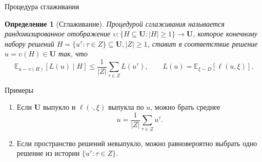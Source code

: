 \documentclass[aspectratio=169]{beamer}
\newtheorem{ru_definition}{Определение}
\begin{document}
\begin{frame}{Процедура сглаживания}
\footnotesize
\begin{ru_definition}[Сглаживание]
Процедурой сглаживания называется рандомизированное отображение $\upsilon:\{H\subseteq \mathbf{U}: |H|\ge 1\}\to \mathbf{U}$,
которое конечному набору решений $ H=\{u^\tau:\tau\in Z\}\subseteq\mathbf{U}, |Z|\ge1$,
ставит в соответствие решение $u=\upsilon(H)\in\mathbf{U}$ так, что
\[
\mathbb{E}_{u\sim\upsilon(H)}[L(u)\mid H]
\le
\frac{1}{|Z|}\sum_{\tau\in Z}L(u^\tau),
\qquad
L(u)=\mathbb{E}_{\xi\sim D}[\ell(u,\xi)].
\]
\end{ru_definition}

\begin{exampleblock}{Примеры}
\begin{enumerate}
\item Если $\mathbf{U}$ выпукло и $\ell(\cdot,\xi)$ выпукла по $u$, можно брать среднее
\[
u=\frac{1}{|Z|}\sum_{\tau\in Z}u^\tau.
\]
\item Если пространство решений невыпукло, можно равновероятно выбрать одно решение из истории $\{u^\tau:\tau\in Z\}$.
\end{enumerate}
\end{exampleblock}
\end{frame}


%
\end{document}

